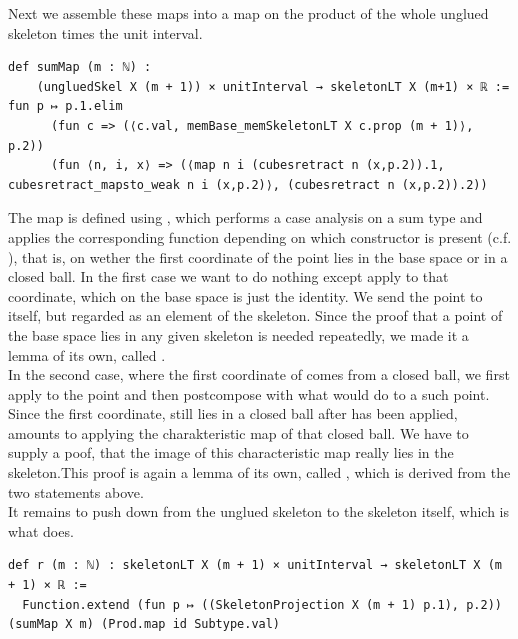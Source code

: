 \documentclass[11pt, a4paper, english]{article}
\theoremstyle{plain}
\theoremstyle{definition}
\theoremstyle{remark}
\numberwithin{equation}{section}
\numberwithin{theorem}{section}
\begin{document}
Next we assemble these maps into a map on the product of the whole unglued skeleton times the unit interval.
\begin{verbatim}
def sumMap (m : ℕ) :
    (ungluedSkel X (m + 1)) × unitInterval → skeletonLT X (m+1) × ℝ := fun p ↦ p.1.elim
      (fun c => (⟨c.val, memBase_memSkeletonLT X c.prop (m + 1)⟩, p.2))
      (fun ⟨n, i, x⟩ => (⟨map n i (cubesretract n (x,p.2)).1, cubesretract_mapsto_weak n i (x,p.2)⟩, (cubesretract n (x,p.2)).2))
\end{verbatim}

The map  is defined using , which performs a case analysis on a sum type and applies the corresponding function depending on which constructor is present (c.f.  \cite{mathlib}), that is, on wether the first coordinate of the point  lies in the base space  or in a closed ball. In the first case we want to do nothing except apply  to that coordinate, which on the base space is just the identity. We send the point  to itself, but regarded as an element of the skeleton. Since the proof that a point of the base space lies in any given skeleton is needed repeatedly, we made it a lemma of its own, called .\\ 
In the second case, where the first coordinate of  comes from a closed ball, we first apply  to the point and then postcompose with what  would do to a such point. Since the first coordinate, still lies in a closed ball after  has been applied,  amounts to applying the charakteristic map of that closed ball. We have to supply a poof, that the image of this characteristic map really lies in the skeleton.This proof is again a lemma of its own, called , which is derived from the two  statements above. \\

It remains to push  down from the unglued skeleton to the skeleton itself, which is what  does.

\begin{verbatim}
def r (m : ℕ) : skeletonLT X (m + 1) × unitInterval → skeletonLT X (m + 1) × ℝ :=
  Function.extend (fun p ↦ ((SkeletonProjection X (m + 1) p.1), p.2)) (sumMap X m) (Prod.map id Subtype.val)
\end{verbatim}
\end{document}
